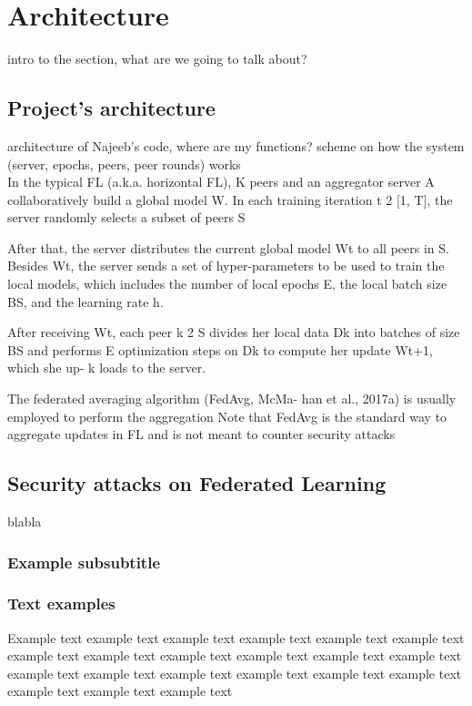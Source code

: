 \section{Architecture}
intro to the section, what are we going to talk about?
\subsection{Project's architecture}
architecture of Najeeb's code, where are my functions?
scheme on how the system (server, epochs, peers, peer rounds) works\\

In the typical FL (a.k.a. horizontal FL), K peers and an aggregator server
A collaboratively build a global model W. In each training iteration
t 2 [1, T], the server randomly selects a subset of peers S

After that, the server distributes the current global model Wt to all peers
in S. Besides Wt, the server sends a set of hyper-parameters to be used
to train the local models, which includes the number of local epochs E,
the local batch size BS, and the learning rate h.

After receiving Wt, each
peer k 2 S divides her local data Dk into batches of size BS and performs
E optimization steps on Dk to compute her update Wt+1, which she up- k
loads to the server.

The federated averaging algorithm (FedAvg, McMa- han et al., 2017a) is usually employed to perform the aggregation
Note that FedAvg is the standard way to aggregate updates in FL and is
not meant to counter security attacks


\subsection{Security attacks on Federated Learning}
blabla

\subsubsection{Example subsubtitle}


\subsubsection{Text examples}
Example text example text example text example text example text example text example text
example text example text example text example text example text example text example text
example text example text example text example text example text example text example text


\pagebreak